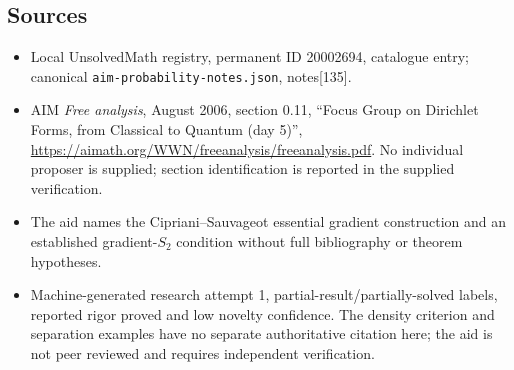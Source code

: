 \documentclass[11pt]{article}
\begin{document}
\subsection{Sources}
\begin{itemize}
\item Local UnsolvedMath registry, permanent ID 20002694, catalogue entry; canonical \texttt{aim-probability-notes.json}, notes[135].
\item AIM \emph{Free analysis}, August 2006, section 0.11, ``Focus Group on Dirichlet Forms, from Classical to Quantum (day 5)'', \url{https://aimath.org/WWN/freeanalysis/freeanalysis.pdf}. No individual proposer is supplied; section identification is reported in the supplied verification.
\item The aid names the Cipriani--Sauvageot essential gradient construction and an established gradient-\(S_2\) condition without full bibliography or theorem hypotheses.
\item Machine-generated research attempt 1, partial-result/partially-solved labels, reported rigor proved and low novelty confidence. The density criterion and separation examples have no separate authoritative citation here; the aid is not peer reviewed and requires independent verification.
\end{itemize}
\end{document}
